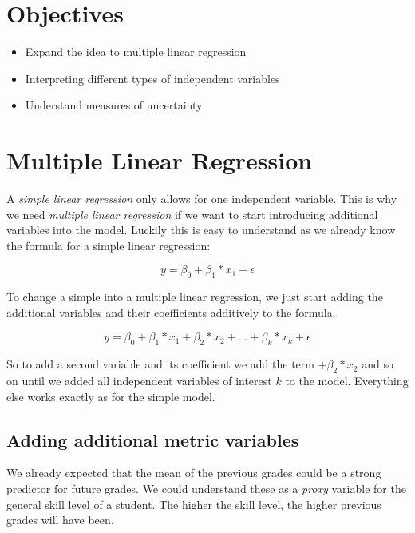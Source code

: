 \documentclass[
]{book}
\providecommand{\tightlist}{%
  \setlength{\itemsep}{0pt}\setlength{\parskip}{0pt}}
\begin{document}
\hypertarget{objectives-3}{%
\section{Objectives}\label{objectives-3}}

\begin{itemize}
\tightlist
\item
  Expand the idea to multiple linear regression
\item
  Interpreting different types of independent variables
\item
  Understand measures of uncertainty
\end{itemize}

\hypertarget{multiple-linear-regression}{%
\section{Multiple Linear Regression}\label{multiple-linear-regression}}

A \emph{simple linear regression} only allows for one independent variable. This is
why we need \emph{multiple linear regression} if we want to start introducing
additional variables into the model. Luckily this is easy to understand as we
already know the formula for a simple linear regression:

\[y = \beta_0 + \beta_1*x_1 + \epsilon\]

To change a simple into a multiple linear regression, we just start adding the
additional variables and their coefficients additively to the formula.

\[y = \beta_0 + \beta_1*x_1 + \beta_2*x_2 + ... + \beta_k*x_k + \epsilon\]

So to add a second variable and its coefficient we add the term \(+ \beta_2*x_2\)
and so on until we added all independent variables of interest \(k\) to the model.
Everything else works exactly as for the simple model.

\hypertarget{adding-additional-metric-variables}{%
\subsection{Adding additional metric variables}\label{adding-additional-metric-variables}}

We already expected that the mean of the previous grades could be a strong
predictor for future grades. We could understand these as a \emph{proxy} variable for
the general skill level of a student. The higher the skill level, the higher
previous grades will have been.
\end{document}
